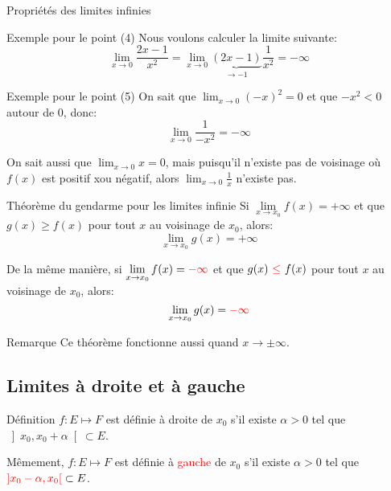 \documentclass[a4paper]{article}
\begin{document}
\begin{parag}{Propriétés des limites infinies}
    \begin{subparag}{Exemple pour le point (4)}
        Nous voulons calculer la limite suivante:
        \[\lim_{x \to 0} \frac{2x - 1}{x^2} = \lim_{x \to 0} \underbrace{\left(2x - 1\right)}_{\to -1} \frac{1}{x^2} = -\infty\]
    \end{subparag}

    \begin{subparag}{Exemple pour le point (5)}
        On sait que $\lim_{x \to 0} \left(-x\right)^2 = 0$ et que $-x^2 < 0$ autour de 0, donc: 
        \[\lim_{x \to 0} \frac{1}{-x^2} = -\infty\]

        On sait aussi que $\lim_{x \to 0} x = 0$, mais puisqu'il n'existe pas de voisinage où $f\left(x\right)$ est positif xou négatif, alors $\lim_{x \to 0} \frac{1}{x}$ n'existe pas.
    \end{subparag}
\end{parag}

\begin{parag}{Théorème du gendarme pour les limites infinie}
    Si $\lim\limits_{x \to x_0} f\left(x\right) = +\infty$ et que $g\left(x\right) \geq f\left(x\right)$ pour tout $x$ au voisinage de $x_0$, alors: 
    \[\lim_{x \to x_0} g\left(x\right) = +\infty\]
    
    De la même manière, si $\lim\limits_{x \to x_0} f\left(x\right) = {\color{red}-\infty}$ et que $g\left(x\right)\ {\color{red}\leq}\ f\left(x\right)$ pour tout $x$ au voisinage de $x_0$, alors: 
    \[\lim_{x \to x_0} g\left(x\right) = {\color{red}-\infty}\]

    \begin{subparag}{Remarque}
        Ce théorème fonctionne aussi quand $x \to \pm \infty$.
    \end{subparag}
\end{parag}

\subsection{Limites à droite et à gauche}
\begin{parag}{Définition}
    $f: E \mapsto F$ est définie à droite de $x_0$ s'il existe $\alpha > 0$ tel que $\left]x_0, x_0 + \alpha\right[ \subset E$.

    Mêmement, $f: E \mapsto F$ est définie à \textcolor{red}{gauche} de $x_0$ s'il existe $\alpha > 0$ tel que ${\color{red}\left]x_0 - \alpha, x_0\right[ } \subset E$.
\end{parag}
\end{document}
